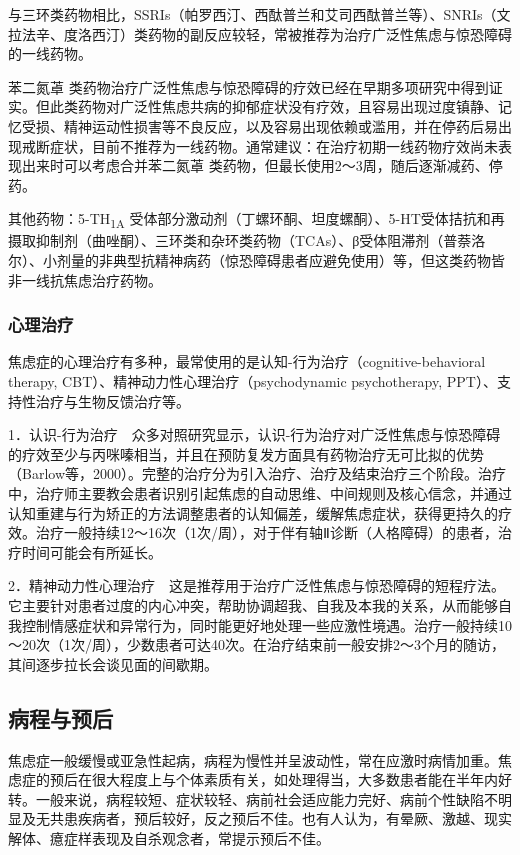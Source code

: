 与三环类药物相比，SSRIs（帕罗西汀、西酞普兰和艾司西酞普兰等）、SNRIs（文拉法辛、度洛西汀）类药物的副反应较轻，常被推荐为治疗广泛性焦虑与惊恐障碍的一线药物。

苯二氮䓬
类药物治疗广泛性焦虑与惊恐障碍的疗效已经在早期多项研究中得到证实。但此类药物对广泛性焦虑共病的抑郁症状没有疗效，且容易出现过度镇静、记忆受损、精神运动性损害等不良反应，以及容易出现依赖或滥用，并在停药后易出现戒断症状，目前不推荐为一线药物。通常建议：在治疗初期一线药物疗效尚未表现出来时可以考虑合并苯二氮䓬
类药物，但最长使用2～3周，随后逐渐减药、停药。

其他药物：5-TH\textsubscript{1A}
受体部分激动剂（丁螺环酮、坦度螺酮）、5-HT受体拮抗和再摄取抑制剂（曲唑酮）、三环类和杂环类药物（TCAs）、β受体阻滞剂（普萘洛尔）、小剂量的非典型抗精神病药（惊恐障碍患者应避免使用）等，但这类药物皆非一线抗焦虑治疗药物。

\subsubsection{心理治疗}

焦虑症的心理治疗有多种，最常使用的是认知-行为治疗（cognitive-behavioral
therapy, CBT）、精神动力性心理治疗（psychodynamic psychotherapy,
PPT）、支持性治疗与生物反馈治疗等。

1．认识-行为治疗　众多对照研究显示，认识-行为治疗对广泛性焦虑与惊恐障碍的疗效至少与丙咪嗪相当，并且在预防复发方面具有药物治疗无可比拟的优势（Barlow等，2000）。完整的治疗分为引入治疗、治疗及结束治疗三个阶段。治疗中，治疗师主要教会患者识别引起焦虑的自动思维、中间规则及核心信念，并通过认知重建与行为矫正的方法调整患者的认知偏差，缓解焦虑症状，获得更持久的疗效。治疗一般持续12～16次（1次/周），对于伴有轴Ⅱ诊断（人格障碍）的患者，治疗时间可能会有所延长。

2．精神动力性心理治疗　这是推荐用于治疗广泛性焦虑与惊恐障碍的短程疗法。它主要针对患者过度的内心冲突，帮助协调超我、自我及本我的关系，从而能够自我控制情感症状和异常行为，同时能更好地处理一些应激性境遇。治疗一般持续10～20次（1次/周），少数患者可达40次。在治疗结束前一般安排2～3个月的随访，其间逐步拉长会谈见面的间歇期。

\subsection{病程与预后}

焦虑症一般缓慢或亚急性起病，病程为慢性并呈波动性，常在应激时病情加重。焦虑症的预后在很大程度上与个体素质有关，如处理得当，大多数患者能在半年内好转。一般来说，病程较短、症状较轻、病前社会适应能力完好、病前个性缺陷不明显及无共患疾病者，预后较好，反之预后不佳。也有人认为，有晕厥、激越、现实解体、癔症样表现及自杀观念者，常提示预后不佳。


